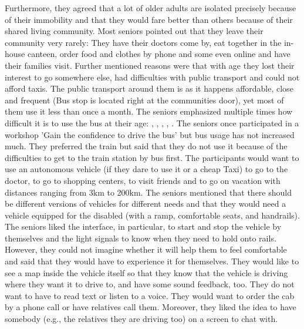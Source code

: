 Furthermore, they agreed that a lot of older adults are isolated precisely because of their immobility and that they would fare better than others because of their shared living community. Most seniors pointed out that they leave their community very rarely: They have their doctors come by, eat together in the in-house canteen, order food and clothes by phone and some even online and have their families visit. Further mentioned reasons were that with age they lost their interest to go somewhere else, had difficulties with public transport and could not afford taxis. The public transport around them is as it happens affordable, close and frequent (Bus stop is located right at the communities door), yet most of them use it less than once a month. The seniors emphasized multiple times how difficult it is to use the bus at their age: , , , , . The seniors once participated in a workshop 'Gain the confidence to drive the bus' but bus usage has not increased much. They preferred the train but said that they do not use it because of the difficulties to get to the train station by bus first. 
The participants would want to use an autonomous vehicle (if they dare to use it or a cheap Taxi) to go to the doctor, to go to shopping centers, to visit friends and to go on vacation with distances ranging from 3km to 200km.  
The seniors mentioned that there should be different versions of vehicles for different needs and that they would need a vehicle equipped for the disabled (with a ramp, comfortable seats, and handrails). The seniors liked the interface, in particular, to start and stop the vehicle by themselves and the light signals to know when they need to hold onto rails. However, they could not imagine whether it will help them to feel comfortable and said that they would have to experience it for themselves. They would like to see a map inside the vehicle itself so that they know that the vehicle is driving where they want it to drive to, and have some sound feedback, too. They do not want to have to read text or listen to a voice. They would want to order the cab by a phone call or have relatives call them. Moreover, they liked the idea to have somebody (e.g., the relatives they are driving too) on a screen to chat with. 


